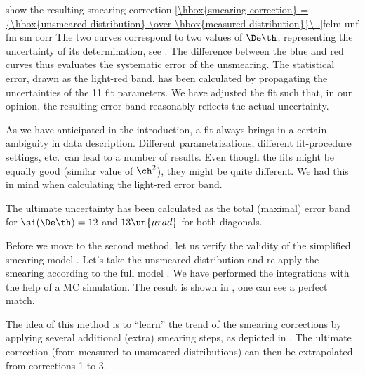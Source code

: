  show the resulting smearing correction
\eqref{\hbox{smearing correction} = {\hbox{unsmeared distribution} \over \hbox{measured distribution}}\ .}{felm unf fm sm corr}
The two curves correspond to two values of $\De\th$, representing the uncertainty of its determination, see . The difference between the blue and red curves thus evaluates the systematic error of the unsmearing. The statistical error, drawn as the light-red band, has been calculated by propagating the uncertainties of the 11 fit parameters. We have adjusted the fit such that, in our opinion, the resulting error band reasonably reflects the actual uncertainty.

As we have anticipated in the introduction, a fit always brings in a certain ambiguity in data description. Different parametrizations, different fit-procedure settings, etc.~can lead to a number of results. Even though the fits might be equally good (similar value of $\ch^2$), they might be quite different. We had this in mind when calculating the light-red error band.

The ultimate uncertainty has been calculated as the total (maximal) error band for $\si(\De\th) = 12$ and $13\un{\mu rad}$ for both diagonals.

Before we move to the second method, let us verify the validity of the simplified smearing model . Let's take the unsmeared distribution and re-apply the smearing according to the full model . We have performed the integrations with the help of a MC simulation. The result is shown in , one can see a perfect match.



The idea of this method is to ``learn'' the trend of the smearing corrections by applying several additional (extra) smearing steps, as depicted in . The ultimate correction (from measured to unsmeared distributions) can then be extrapolated from corrections 1 to 3.


